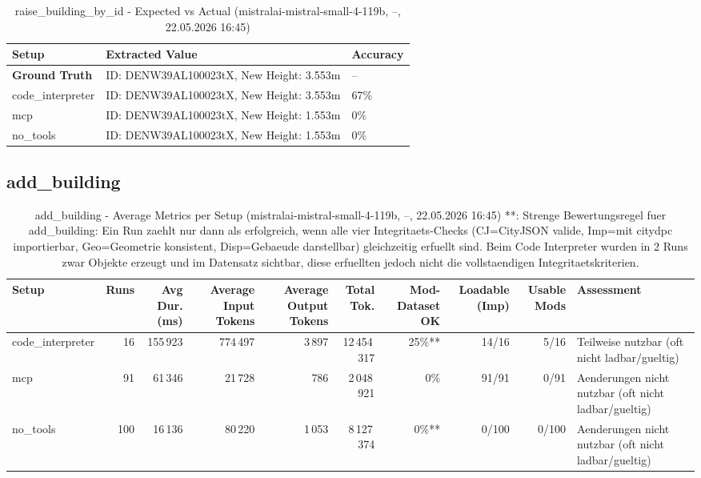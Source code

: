 \documentclass[a4paper,11pt]{article}
\begin{document}
\begin{table}[H]
\centering
\scriptsize
\caption{raise\_building\_by\_id - Expected vs Actual (mistralai-mistral-small-4-119b, --, 22.05.2026 16:45)}
\begin{tabular}{l l l}
\toprule
Setup & Extracted Value & Accuracy \\
\midrule
\textbf{Ground Truth} & ID: DENW39AL100023tX, New Height: 3.553m & -- \\
\midrule
code\_interpreter & ID: DENW39AL100023tX, New Height: 3.553m & 67\% \\
mcp & ID: DENW39AL100023tX, New Height: 1.553m & 0\% \\
no\_tools & ID: DENW39AL100023tX, New Height: 1.553m & 0\% \\
\bottomrule
\end{tabular}
\end{table}

\clearpage

\subsection{add\_building}

\begin{table}[H]
\centering
\scriptsize
\caption{add\_building - Average Metrics per Setup (mistralai-mistral-small-4-119b, --, 22.05.2026 16:45) **: Strenge Bewertungsregel fuer add\_building: Ein Run zaehlt nur dann als erfolgreich, wenn alle vier Integritaets-Checks (CJ=CityJSON valide, Imp=mit citydpc importierbar, Geo=Geometrie konsistent, Disp=Gebaeude darstellbar) gleichzeitig erfuellt sind. Beim Code Interpreter wurden in 2 Runs zwar Objekte erzeugt und im Datensatz sichtbar, diese erfuellten jedoch nicht die vollstaendigen Integritaetskriterien.}
\label{tab:combined\_add\_building\_metrics\_20260522}
\begin{tabular}{l r r r r r r r r l}
\toprule
Setup & Runs & Avg Dur. (ms) & Average Input Tokens & Average Output Tokens & Total Tok. & Mod-Dataset OK & Loadable (Imp) & Usable Mods & Assessment \\
\midrule
code\_interpreter & 16 & 155\,923 & 774\,497 & 3\,897 & 12\,454\,317 & 25\%** & 14/16 & 5/16 & Teilweise nutzbar (oft nicht ladbar/gueltig) \\
mcp & 91 & 61\,346 & 21\,728 & 786 & 2\,048\,921 & 0\% & 91/91 & 0/91 & Aenderungen nicht nutzbar (oft nicht ladbar/gueltig) \\
no\_tools & 100 & 16\,136 & 80\,220 & 1\,053 & 8\,127\,374 & 0\%** & 0/100 & 0/100 & Aenderungen nicht nutzbar (oft nicht ladbar/gueltig) \\
\bottomrule
\end{tabular}
\end{table}
\end{document}
